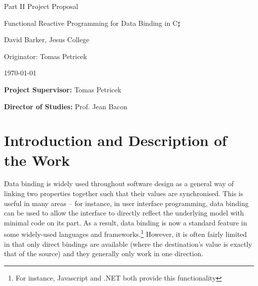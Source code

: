 


%


\vfil

\centerline{\Large Part II Project Proposal}
\vspace{0.4in}
\centerline{\Large Functional Reactive Programming for Data Binding in C$\sharp$\ }
\vspace{0.4in}
\centerline{\large David Barker, Jesus College}
\vspace{0.3in}
\centerline{\large Originator: Tomas Petricek}
\vspace{0.3in}
\centerline{\large \today}

\vfil


\noindent
{\bf Project Supervisor:} Tomas Petricek
\vspace{0.2in}

\noindent
{\bf Director of Studies:} Prof. Jean Bacon
\vspace{0.2in}
\noindent

\section*{Introduction and Description of the Work}

	Data binding is widely used throughout software design as a general way of linking two properties together such that their values are synchronised. This is useful in many areas -- for instance, in user interface programming, data binding can be used to allow the interface to directly reflect the underlying model with minimal code on its part. As a result, data binding is now a standard feature in some widely-used languages and frameworks.\footnote{For instance, Javascript\cite{javabinding} and .NET\cite{netbinding} both provide this functionality} However, it is often fairly limited in that only direct bindings are available (where the destination's value is exactly that of the source) and they generally only work in one direction.
	
